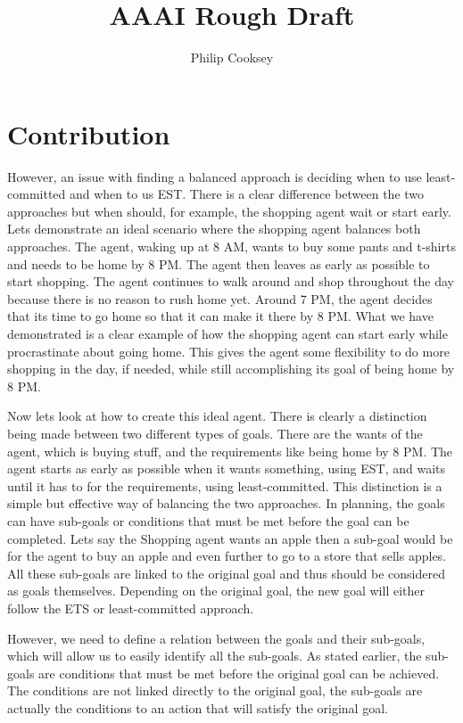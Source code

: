 \documentclass[a4paper]{article}
\begin{document}
\title{AAAI Rough Draft}
\author{Philip Cooksey}
\maketitle{}




 
\section{Contribution}

However, an issue with finding a balanced approach is deciding when to use
least-committed and when to us EST. There is a clear difference between
the two approaches but when should, for example, the shopping agent wait
or start early. Lets demonstrate an ideal scenario where the shopping
agent balances both approaches. The agent, waking up at 8 AM, wants to
buy some pants and t-shirts and needs to be home by 8 PM. The agent then
leaves as early as possible to start shopping. The agent continues to
walk around and shop throughout the day because there is no reason to
rush home yet. Around 7 PM, the agent decides that its time to go home
so that it can make it there by 8 PM. What we have demonstrated is a
clear example of how the shopping agent can start early while
procrastinate about going home. This gives the agent some flexibility to
do more shopping in the day, if needed, while still accomplishing its
goal of being home by 8 PM.

Now lets look at how to create this ideal agent. There is clearly a
distinction being made between two different types of goals. There are
the wants of the agent, which is buying stuff, and the requirements like
being home by 8 PM.  The agent starts as early as possible when it wants
something, using EST, and waits until it has to for the requirements,
using least-committed. This distinction is a simple but effective way of
balancing the two approaches. In planning, the goals can have sub-goals
or conditions that must be met before the goal can be completed. Lets
say the Shopping agent wants an apple then a sub-goal would be for the
agent to buy an apple and even further to go to a store that sells
apples. All these sub-goals are linked to the original goal and thus
should be considered as goals themselves. Depending on the original
goal, the new goal will either follow the ETS or least-committed
approach.

However, we need to define a relation between the goals and their
sub-goals, which will allow us to easily identify all the sub-goals. As
stated earlier, the sub-goals are conditions that must be met before the
original goal can be achieved. The conditions are not linked directly to
the original goal, the sub-goals are actually the conditions to an
action that will satisfy the original goal.
\end{document}
